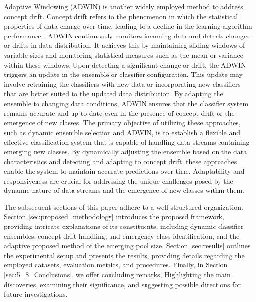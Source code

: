 Adaptive Windowing (ADWIN) is another widely employed method to address concept drift. Concept drift refers to the phenomenon in which the statistical properties of data change over time, leading to a decline in the learning algorithm performance \cite{gama2004learning}\cite{adams2023explainable}\cite{madkour2023historical}. ADWIN continuously monitors incoming data and detects changes or drifts in data distribution. It achieves this by maintaining sliding windows of variable sizes and monitoring statistical measures such as the mean or variance within these windows. Upon detecting a significant change or drift, the ADWIN triggers an update in the ensemble or classifier configuration. This update may involve retraining the classifiers with new data or incorporating new classifiers that are better suited to the updated data distribution. By adapting the ensemble to changing data conditions, ADWIN ensures that the classifier system remains accurate and up-to-date even in the presence of concept drift or the emergence of new classes. The primary objective of utilizing these approaches, such as dynamic ensemble selection and ADWIN, is to establish a flexible and effective classification system that is capable of handling data streams containing emerging new classes. By dynamically adjusting the ensemble based on the data characteristics and detecting and adapting to concept drift, these approaches enable the system to maintain accurate predictions over time. Adaptability and responsiveness are crucial for addressing the unique challenges posed by the dynamic nature of data streams and the emergence of new classes within them.

The subsequent sections of this paper adhere to a well-structured organization. Section \ref{sec:proposed_methodology} introduces the proposed framework, providing intricate explanations of its constituents, including dynamic classifier ensembles, concept drift handling, and emergency class identification, and the adaptive proposed method of the emerging pool size. Section \ref{sec:results} outlines the experimental setup and presents the results, providing details regarding the employed datasets, evaluation metrics, and procedures. Finally, in Section \ref{sec:5_8_Conclusions}, we offer concluding remarks, Highlighting the main discoveries, examining their significance, and suggesting possible directions for future investigations.
  
  

